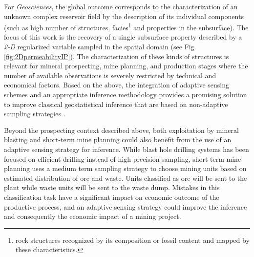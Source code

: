 For \emph{Geosciences}, the global outcome corresponds to the characterization of an unknown complex reservoir field by the description of its individual components (such as high number of structures, facies\footnote{rock structures recognized by its composition or fossil content and mapped  by these characteristics.} and properties in the subsurface). The focus of this work is the recovery of a single subsurface property described by a \emph{2-D} regularized variable sampled in the spatial domain (see Fig. \ref{fig:2DpermeabilityIP}). The characterization of these kinds of structures is relevant for mineral prospecting, mine planning, and production stages where the number of available observations is severely restricted by technical and economical factors. Based on the above, the integration of adaptive sensing schemes and an appropriate inference methodology provides a promising solution to improve classical geostatistical inference that are based on non-adaptive sampling strategies \citep{krause08thesis,krause09simultaneous,Krause_2008b,GuyagulerBaris2002_a}.

Beyond the prospecting context described above, both exploitation by mineral blasting and short-term mine planning could also benefit from the use of an adaptive sensing strategy for inference. While blast hole drilling systems has been focused on efficient drilling instead of high precision sampling, short term mine planning uses a medium term sampling strategy to choose mining units based on estimated distribution of ore and waste. Units classified as ore will be sent to the plant while waste units will be sent to the waste dump. Mistakes in this classification task have a significant impact on economic outcome of the productive process, and an adaptive sensing strategy could improve the inference and consequently
the economic impact of a mining project.




